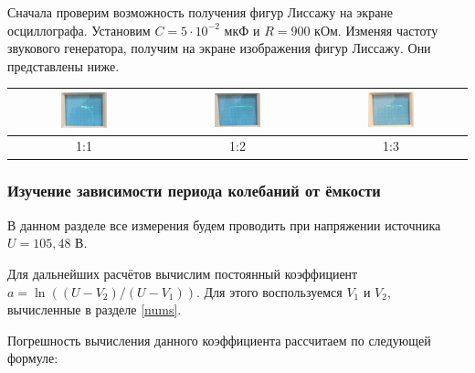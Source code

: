 \documentclass[a4paper,12pt]{article} %
\begin{document}
Сначала проверим возможность получения фигур Лиссажу на экране осциллографа. Установим $ C = 5\cdot10^{-2} $ мкФ и $ R = 900 $ кОм. Изменяя частоту звукового генератора, получим на экране изображения фигур Лиссажу. Они представлены ниже.

\begin{table}[H]
	\centering
	\begin{tabular}{|c|c|c|}
		\hline
	\includegraphics[width=0.33\textwidth]{ris6.jpg}	& \includegraphics[width=0.33\textwidth]{ris7.jpg} & \includegraphics[width=0.33\textwidth]{ris8.jpg} \\ \hline
	1:1	& 1:2 & 1:3 \\ \hline
	\end{tabular}
\end{table}

\subsubsection{Изучение зависимости периода колебаний от ёмкости}

В данном разделе все измерения будем проводить при напряжении источника $ U = 105,48 $ В.

Для дальнейших расчётов вычислим постоянный коэффициент $ a = \ln((U - V_2)/(U-V_1)) $. Для этого воспользуемся $ V_1 $ и $ V_2 $, вычисленные в разделе \ref{nums}.

Погрешность вычисления данного коэффициента рассчитаем по следующей формуле:
\end{document}
